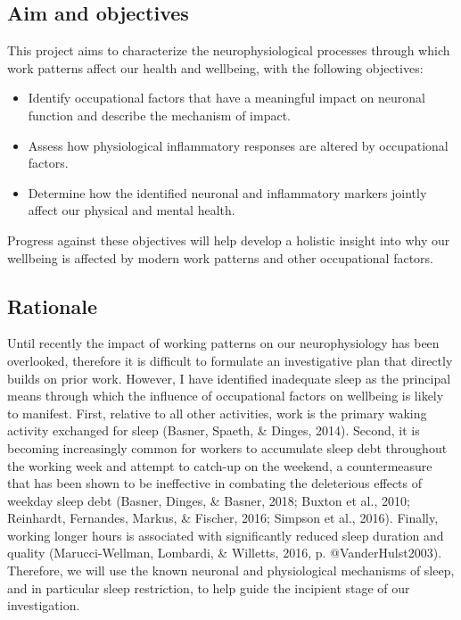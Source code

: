 \documentclass[
  english,
  man]{apa6}
\providecommand{\tightlist}{%
  \setlength{\itemsep}{0pt}\setlength{\parskip}{0pt}}
\begin{document}
\newpage

\hypertarget{aim-and-objectives}{%
\subsection{Aim and objectives}\label{aim-and-objectives}}

This project aims to characterize the neurophysiological processes through which work patterns affect our health and wellbeing, with the following objectives:

\begin{itemize}
\tightlist
\item
  Identify occupational factors that have a meaningful impact on neuronal function and describe the mechanism of impact.
\item
  Assess how physiological inflammatory responses are altered by occupational factors.
\item
  Determine how the identified neuronal and inflammatory markers jointly affect our physical and mental health.
\end{itemize}

Progress against these objectives will help develop a holistic insight into why our wellbeing is affected by modern work patterns and other occupational factors.

\newpage

\hypertarget{rationale}{%
\subsection{Rationale}\label{rationale}}

Until recently the impact of working patterns on our neurophysiology has been overlooked, therefore it is difficult to formulate an investigative plan that directly builds on prior work. However, I have identified inadequate sleep as the principal means through which the influence of occupational factors on wellbeing is likely to manifest. First, relative to all other activities, work is the primary waking activity exchanged for sleep (Basner, Spaeth, \& Dinges, 2014). Second, it is becoming increasingly common for workers to accumulate sleep debt throughout the working week and attempt to catch-up on the weekend, a countermeasure that has been shown to be ineffective in combating the deleterious effects of weekday sleep debt (Basner, Dinges, \& Basner, 2018; Buxton et al., 2010; Reinhardt, Fernandes, Markus, \& Fischer, 2016; Simpson et al., 2016). Finally, working longer hours is associated with significantly reduced sleep duration and quality (Marucci-Wellman, Lombardi, \& Willetts, 2016, p. @VanderHulst2003). Therefore, we will use the known neuronal and physiological mechanisms of sleep, and in particular sleep restriction, to help guide the incipient stage of our investigation.
\end{document}
